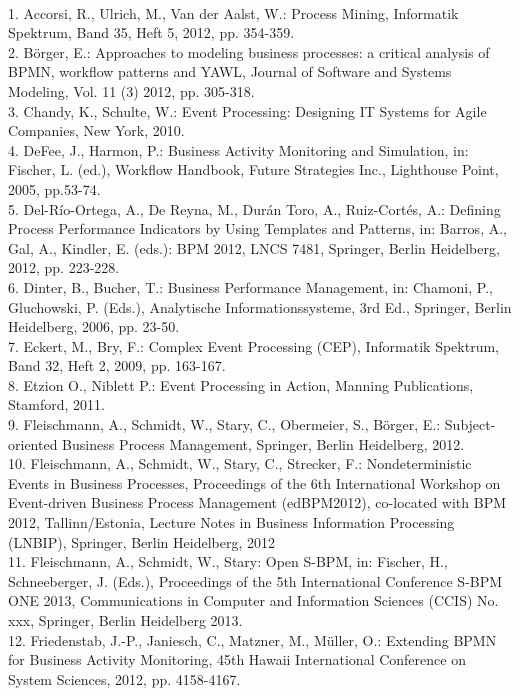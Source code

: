 \\
1.	Accorsi, R., Ulrich, M., Van der Aalst, W.: Process Mining, Informatik Spektrum, Band 35, Heft 5, 2012, pp. 354-359.
\\
2.	Börger, E.: Approaches to modeling business processes: a critical analysis of BPMN, workflow patterns and YAWL, Journal of Software and Systems Modeling, Vol. 11 (3) 2012, pp. 305-318.
\\
3.	Chandy, K., Schulte, W.: Event Processing: Designing IT Systems for Agile Companies, New York, 2010.
\\
4.	DeFee, J., Harmon, P.: Business Activity Monitoring and Simulation, in: Fischer, L. (ed.), Workflow Handbook, Future Strategies Inc., Lighthouse Point, 2005, pp.53-74.
\\
5.	Del-Río-Ortega, A., De Reyna, M., Durán Toro, A., Ruiz-Cortés, A.: Defining Process Performance Indicators by Using Templates and Patterns, in: Barros, A., Gal, A., Kindler, E. (eds.): BPM 2012, LNCS 7481, Springer, Berlin Heidelberg, 2012, pp. 223-228.
\\
6.	Dinter, B., Bucher, T.: Business Performance Management, in: Chamoni, P., Gluchowski, P. (Eds.), Analytische Informationssysteme, 3rd Ed., Springer, Berlin Heidelberg, 2006, pp. 23-50.
\\
7.	Eckert, M., Bry, F.: Complex Event Processing (CEP), Informatik Spektrum, Band 32, Heft 2, 2009, pp. 163-167.
\\
8.	Etzion O., Niblett P.: Event Processing in Action, Manning Publications, Stamford, 2011.
\\
9.	Fleischmann, A., Schmidt, W., Stary, C., Obermeier, S., Börger, E.: Subject-oriented Business Process Management, Springer, Berlin Heidelberg, 2012.
\\
10.	Fleischmann, A., Schmidt, W., Stary, C., Strecker, F.: Nondeterministic Events in Business Processes, Proceedings of the 6th International Workshop on Event-driven Business Process Management (edBPM2012), co-located with BPM 2012, Tallinn/Estonia, Lecture Notes in Business Information Processing (LNBIP), Springer, Berlin Heidelberg, 2012
\\
11.	Fleischmann, A., Schmidt, W., Stary: Open S-BPM, in: Fischer, H., Schneeberger, J. (Eds.), Proceedings of the 5th International Conference S-BPM ONE 2013, Communications in Computer and Information Sciences (CCIS) No. xxx, Springer, Berlin Heidelberg 2013.
\\
12.	Friedenstab, J.-P., Janiesch, C., Matzner, M., Müller, O.: Extending BPMN for Business Activity Monitoring, 45th Hawaii International Conference on System Sciences, 2012, pp. 4158-4167.
